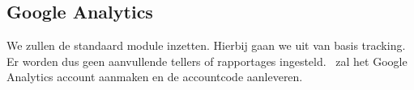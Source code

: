 \subsection{Google Analytics}\label{analytics}

We zullen de standaard  module inzetten. Hierbij gaan we uit van basis tracking. Er worden dus geen aanvullende tellers of rapportages ingesteld. \thecustomer \ zal het Google Analytics account aanmaken en de accountcode aanleveren.